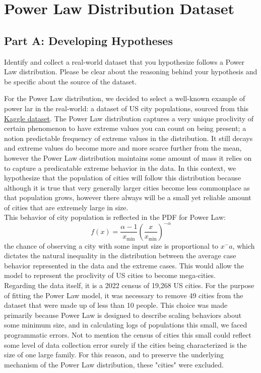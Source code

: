 \section{Power Law Distribution Dataset}

\subsection{Part A: Developing Hypotheses}
Identify and collect a real-world dataset that you hypothesize follows a Power Law distribution. Please be clear about the reasoning behind your hypothesis and be specific about the source of the dataset.

For the Power Law distribution, we decided to select a well-known example of power lar in the real-world: a dataset of US city populations, sourced from this \hyperlink{https://www.kaggle.com/datasets/bharxhav/us-city-populations-and-coordinates}{Kaggle dataset}. The Power Law distribution captures a very unique proclivity of certain phenomenon to have extreme values you can count on being present; a notion predictable frequency of extreme values in the distribution. It still decays and extreme values do become more and more scarce further from the mean, however the Power Law distribution maintains some amount of mass it relies on to capture a predicatable extreme behavior in the data. In this context, we hypothesize that the population of cities will follow this distribution because although it is true that very generally larger cities become less commonplace as that population grows, however there always will be a small yet reliable amount of cities that are extremely large in size.\\

This behavior of city population is reflected in the PDF for Power Law:
$$
f(x) = \frac{\alpha - 1}{x_{\min}} \left(\frac{x}{x_{\min}}\right)^{-\alpha}
$$
the chance of observing a city with some input size is proportional to $ x^-a $, which dictates the natural inequality in the distribution between the average case behavior represented in the data and the extreme cases. This would allow the model to represent the proclivity of US cities to become mega-cities.\\

Regarding the data itself, it is a 2022 census of 19,268 US cities. For the purpose of fitting the Power Law model, it was necessary to remove 49 cities from the dataset that were made up of less than 10 people. This choice was made primarily because Power Law is designed to describe scaling behaviors about some minimum size, and in calculating logs of populations this small, we faced programmatic errors. Not to mention the census of cities this small could reflect some level of data collection error surely if the cities being characterized is the size of one large family. For this reason, and to preserve the underlying mechanism of the Power Law distribution, these "cities" were excluded.\\

